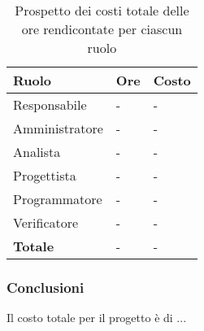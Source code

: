 			\begin{longtable}{ 
				>{\centering}p{} 
				>{\centering}p{}
				>{\centering\arraybackslash}p{} }
	
				\caption {Prospetto dei costi totale delle ore rendicontate per ciascun ruolo}		\\
			
				\textbf{\color{white}Ruolo} & 
				\textbf{\color{white}Ore} & 
				\textbf{\color{white}Costo }
				\tabularnewline  
				\endhead
			
				Responsabile & - & - \\
				Amministratore & - & - \\
				Analista & - & - \\
				Progettista & - & - \\
				Programmatore & - & - \\
				Verificatore & - & - \\
				\textbf{Totale} & - & - \\
			\end{longtable}
		
	\subsubsection{Conclusioni}
		Il costo totale per il progetto è di ...
	
	
	
	
	
	
	
	
	
	
	
	
	
	
	
	
	